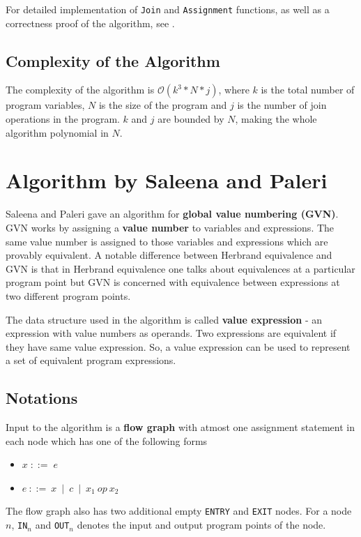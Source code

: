 For detailed implementation of \texttt{Join} and \texttt{Assignment} 
functions, as well as a correctness proof of the algorithm, see 
\cite{Gulwani}.

\subsection{Complexity of the Algorithm}
\label{subsec:ComplexityOfTheAlgorithm}
The complexity of the algorithm is $\mathcal{O}(k^{3} * N * j)$, where 
$k$ is the total number of program variables, $N$ is the size of the 
program and $j$ is the number of join operations in the program. $k$ and 
$j$ are bounded by $N$, making the whole algorithm polynomial in $N$.

\section{Algorithm by Saleena and Paleri}
\label{sec:AlgorithmBySaleenAndPaleri}
Saleena and Paleri \cite{Saleena} gave an algorithm for \textbf{global 
value numbering (GVN)}. GVN works by assigning a \textbf{value number} 
to variables and expressions. The same value number is assigned to those 
variables and expressions which are provably equivalent. A notable 
difference between Herbrand equivalence and GVN is that in Herbrand 
equivalence one talks about equivalences at a particular program point 
but GVN is concerned with equivalence between expressions at two 
different program points.

The data structure used in the algorithm is called \textbf{value 
expression} - an expression with value numbers as operands. Two 
expressions are equivalent if they have same value expression. 
So, a value expression can be used to represent a set of equivalent 
program expressions.

\subsection{Notations}
\label{subsec:NotationsSaleena}
Input to the algorithm is a \textbf{flow graph} with atmost one assignment 
statement in each node which has one of the following forms
\begin{itemize} \tightlist
    \item $x\; ::=\; e$
    \item $e\ ::=\ x\ \mid\ c\ \mid\ x_1\ op\ x_2$
\end{itemize}
The flow graph also has two additional empty \texttt{ENTRY} and \texttt{EXIT} 
nodes. For a node $n$, \texttt{IN$_n$} and \texttt{OUT$_n$} denotes the input 
and output program points of the node.


